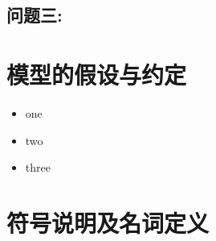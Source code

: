 \documentclass{cumcmthesis}
\begin{document}
		\subsection{问题三:}
	\section{模型的假设与约定}
		\begin{itemize}
			\item{} one
			\item{} two
			\item{} three
		\end{itemize}
	\section{符号说明及名词定义}
\end{document}
